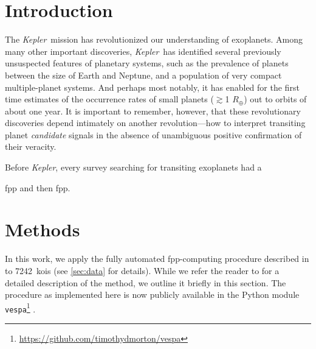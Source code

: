 \documentclass{emulateapj}
\newcommand{\ncalc}{7242}
\newcommand{\kepler}{\textit{Kepler}}
\newcommand{\vespa}{\texttt{vespa}}
\begin{document}

\keywords{}


\section{Introduction}
\acresetall

The \kepler\ mission has revolutionized our understanding of
exoplanets.  Among many other important discoveries, \kepler\ has
identified several previously unsuspected features of planetary
systems, such as the prevalence of planets between the size of Earth
and Neptune, and a population of very compact multiple-planet
systems. And perhaps most notably, it has enabled for the first time
estimates of the occurrence rates of small planets ($\gtrsim$1
$R_\oplus$) out to orbits of about one year.  It is important to
remember, however, that these revolutionary discoveries depend
intimately on another revolution---how to interpret transiting planet
\textit{candidate} signals in the absence of unambiguous positive
confirmation of their veracity.

Before \kepler, every survey searching for transiting exoplanets had a 

\ac{fpp} and then \ac{fpp}.


\section{Methods}
\label{sec:methods}

In this work, we apply the fully automated \ac{fpp}-computing
procedure described in \citet[][hereafter
  ]{Morton:2012} to \ncalc\ \acp{koi} (see
\autoref{sec:data} for details).  While we refer the reader to
 for a detailed description of the method, we
outline it briefly in this section.  The procedure as implemented here
is now publicly available in the Python module
\vespa\footnote{\url{https://github.com/timothydmorton/vespa}}
\citep{vespa}.
\end{document}
